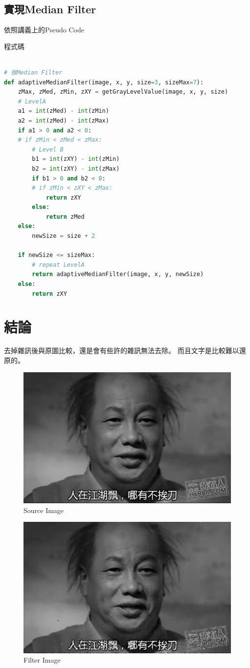 \documentclass[12pt,a4paper]{article}
\begin{document}
\subsection{實現Median Filter}
{
依照講義上的Pseudo Code

程式碼
\begin{lstlisting}[language=Python]

# 做Median Filter
def adaptiveMedianFilter(image, x, y, size=3, sizeMax=7):
    zMax, zMed, zMin, zXY = getGrayLevelValue(image, x, y, size)
    # LevelA
    a1 = int(zMed) - int(zMin)
    a2 = int(zMed) - int(zMax)
    if a1 > 0 and a2 < 0:
    # if zMin < zMed < zMax:
        # Level B
        b1 = int(zXY) - int(zMin)
        b2 = int(zXY) - int(zMax)
        if b1 > 0 and b2 < 0:
        # if zMin < zXY < zMax:
            return zXY
        else:
            return zMed
    else:
        newSize = size + 2

    if newSize <= sizeMax:
        # repeat LevelA
        return adaptiveMedianFilter(image, x, y, newSize)
    else:
        return zXY
\end{lstlisting}
}

\newpage
\section{結論}
去掉雜訊後與原圖比較，還是會有些許的雜訊無法去除。
而且文字是比較難以還原的。
\begin{figure}[ht]
\centering
\includegraphics[width=.8\textwidth]{image/gray_image.png}
\caption{Source Image}%
\label{合併影像}%
\end{figure}
\begin{figure}[ht]
\centering
\includegraphics[width=.8\textwidth]{image/filterNoise_Image.png}
\caption{Filter Image}%
\label{合併影像}%
\end{figure}
\end{document}
